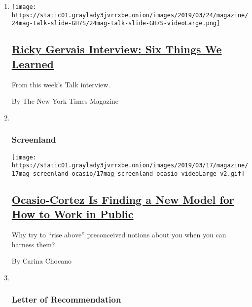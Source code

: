 \begin{enumerate}
\def\labelenumi{\arabic{enumi}.}
\item
  \texttt{[image: https://static01.graylady3jvrrxbe.onion/images/2019/03/24/magazine/24mag-talk-slide-GH7S/24mag-talk-slide-GH7S-videoLarge.png]}

  \hypertarget{ricky-gervais-interview-six-things-we-learned}{%
  \subsection{\texorpdfstring{\href{/2019/03/19/magazine/ricky-gervais-interview-twitter.html}{Ricky
  Gervais Interview: Six Things We
  Learned}}{Ricky Gervais Interview: Six Things We Learned}}\label{ricky-gervais-interview-six-things-we-learned}}

  From this week's Talk interview.

  By The New York Times Magazine
\item ~
  \hypertarget{screenland}{%
  \subsubsection{Screenland}\label{screenland}}

  \texttt{[image: https://static01.graylady3jvrrxbe.onion/images/2019/03/17/magazine/17mag-screenland-ocasio/17mag-screenland-ocasio-videoLarge-v2.gif]}

  \hypertarget{ocasio-cortez-is-finding-a-new-model-for-how-to-work-in-public}{%
  \subsection{\texorpdfstring{\href{/2019/03/20/magazine/ocasio-cortez-is-finding-a-new-model-for-how-to-work-in-public.html}{Ocasio-Cortez
  Is Finding a New Model for How to Work in
  Public}}{Ocasio-Cortez Is Finding a New Model for How to Work in Public}}\label{ocasio-cortez-is-finding-a-new-model-for-how-to-work-in-public}}

  Why try to ``rise above'' preconceived notions about you when you can
  harness them?

  By Carina Chocano
\item ~
  \hypertarget{letter-of-recommendation}{%
  \subsubsection{Letter of
  Recommendation}\label{letter-of-recommendation}}


\end{enumerate}
